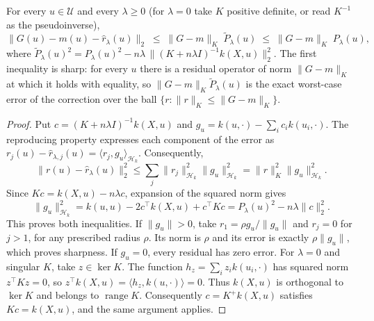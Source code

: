 \documentclass[twoside,11pt]{article}
\begin{document}
\begin{theorem}\label{thm:or}
For every $u\in\mathcal U$ and every $\lambda\ge0$ (for $\lambda=0$ take $K$
positive definite, or read $K^{-1}$ as the pseudoinverse),
\[
\big\|G(u)-m(u)-\widehat r_\lambda(u)\big\|_2\;\le\;\|G-m\|_K\;
\widetilde P_\lambda(u)\;\le\;\|G-m\|_K\;P_\lambda(u),
\]
where
$\widetilde P_\lambda(u)^2=P_\lambda(u)^2-n\lambda\,\|(K+n\lambda
I)^{-1}k(X,u)\|_2^2$. The first inequality is sharp: for every $u$ there is
a residual operator of norm $\|G-m\|_K$ at which it holds with equality, so
$\|G-m\|_K\widetilde P_\lambda(u)$ is the exact worst-case error of the correction
over the ball $\{r:\|r\|_K\le\|G-m\|_K\}$.
\end{theorem}
\begin{proof}
Put $c=(K+n\lambda I)^{-1}k(X,u)$ and
$g_u=k(u,\cdot)-\sum_i c_i k(u_i,\cdot)$.
The reproducing property expresses each component of the error as
$r_j(u)-\widehat r_{\lambda,j}(u)=\langle r_j,g_u\rangle_{\mathcal H_k}$.
Consequently,
\[
\|r(u)-\widehat r_\lambda(u)\|_2^2
\le\sum_j\|r_j\|_{\mathcal H_k}^2\|g_u\|_{\mathcal H_k}^2
=\|r\|_K^2\|g_u\|_{\mathcal H_k}^2.
\]
Since $Kc=k(X,u)-n\lambda c$, expansion of the squared norm gives
\[
\|g_u\|_{\mathcal H_k}^2
=k(u,u)-2c^\top k(X,u)+c^\top Kc
=P_\lambda(u)^2-n\lambda\|c\|_2^2.
\]
This proves both inequalities. If $\|g_u\|>0$, take
$r_1=\rho g_u/\|g_u\|$ and $r_j=0$ for $j>1$, for any prescribed
radius $\rho$. Its norm is $\rho$ and its error is exactly $\rho\|g_u\|$,
which proves sharpness. If $g_u=0$, every residual has zero error.
For $\lambda=0$ and singular $K$, take $z\in\ker K$. The function
$h_z=\sum_i z_i k(u_i,\cdot)$ has squared norm $z^\top Kz=0$, so
$z^\top k(X,u)=\langle h_z,k(u,\cdot)\rangle=0$.
Thus $k(X,u)$ is orthogonal to $\ker K$ and belongs to
$\operatorname{range}K$. Consequently $c=K^+k(X,u)$ satisfies
$Kc=k(X,u)$, and the same argument applies.
\end{proof}
\end{document}
